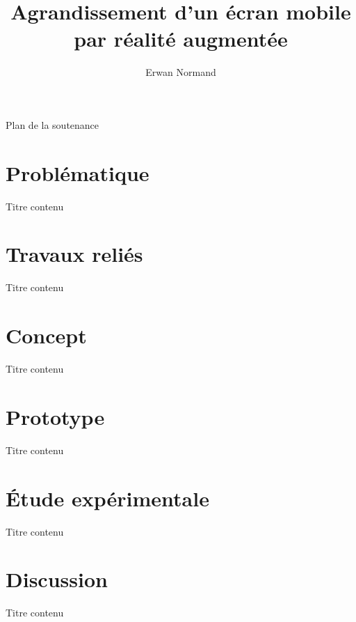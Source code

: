 \documentclass{beamer}
\title[Agrandissement d'un écran mobile par RA]{Agrandissement d'un écran mobile par réalité augmentée}
\author[Erwan Normand]{Erwan Normand}%
\institute{Soutenance de mémoire de maîtrise}
\date{\frenchdate{2018}{08}{29}}
\begin{document}
\maketitle

\begin{frame}{Plan de la soutenance}
  \tableofcontents
\end{frame}


\section{Problématique} %
\begin{frame}{Titre}
  contenu
\end{frame}


\section{Travaux reliés} %
\begin{frame}{Titre}
  contenu
\end{frame}


\section{Concept} %
\begin{frame}{Titre}
  contenu
\end{frame}


\section{Prototype} %
\begin{frame}{Titre}
  contenu
\end{frame}


\section{Étude expérimentale} %
\begin{frame}{Titre}
  contenu
\end{frame}


\section{Discussion} %
\begin{frame}{Titre}
  contenu
\end{frame}
\end{document}
